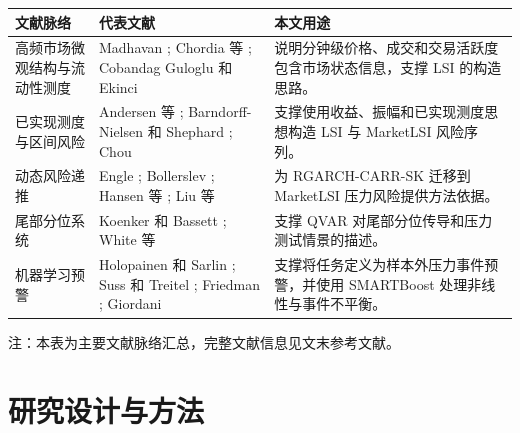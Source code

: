 \documentclass[12pt,a4paper]{ctexart}
\begin{document}
\begin{center}
\begingroup
\captionsetup{type=table}
\begin{minipage}{\textwidth}
\centering
{}
\label{tab:literature-map}
\small
\begin{threeparttable}
\begin{tabularx}{\textwidth}{p{}Y Y}
\toprule
文献脉络 & 代表文献 & 本文用途 \\
\midrule
高频市场微观结构与流动性测度 & Madhavan \cite{madhavan2000survey}; Chordia 等 \cite{chordia2001liquidity}; Cobandag Guloglu 和 Ekinci \cite{cobandag2022liquidityreview} & 说明分钟级价格、成交和交易活跃度包含市场状态信息，支撑 LSI 的构造思路。 \\
已实现测度与区间风险 & Andersen 等 \cite{andersen2003realized}; Barndorff-Nielsen 和 Shephard \cite{barndorff2004bipower}; Chou \cite{chou2005carr} & 支撑使用收益、振幅和已实现测度思想构造 LSI 与 MarketLSI 风险序列。 \\
动态风险递推 & Engle \cite{engle1982arch}; Bollerslev \cite{bollerslev1986garch}; Hansen 等 \cite{hansen2012realizedgarch}; Liu 等 \cite{liu2025rgarchcarrsk} & 为 RGARCH-CARR-SK 迁移到 MarketLSI 压力风险提供方法依据。 \\
尾部分位系统 & Koenker 和 Bassett \cite{koenker1978rq}; White 等 \cite{white2015varforvar} & 支撑 QVAR 对尾部分位传导和压力测试情景的描述。 \\
机器学习预警 & Holopainen 和 Sarlin \cite{holopainen2016earlywarning}; Suss 和 Treitel \cite{suss2019bankdistress}; Friedman \cite{friedman2001gbm}; Giordani \cite{giordani2025smartboost} & 支撑将任务定义为样本外压力事件预警，并使用 SMARTBoost 处理非线性与事件不平衡。 \\
\bottomrule
\end{tabularx}
\begin{tablenotes}[flushleft]
\footnotesize
\item 注：本表为主要文献脉络汇总，完整文献信息见文末参考文献。
\end{tablenotes}
\end{threeparttable}
\end{minipage}
\endgroup
\end{center}


\newpage
\section{研究设计与方法}
\end{document}
